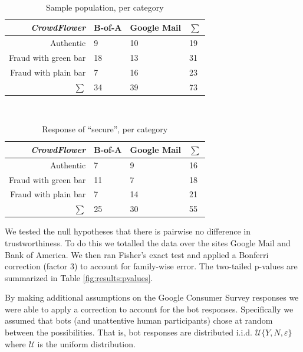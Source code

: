 \documentclass[twoside,letterpaper]{soups}
\begin{document}
\begin{table}
\centering
\caption{Sample population, per category}
\mbox{}\\
\begin{tabular}{|r|l|l|l|}
\hline
\emph{CrowdFlower}   & B-of-A   & Google Mail   & $\sum$ \\
\hline
Authentic            & 9        & 10            & 19 \\
\hline
Fraud with green bar & 18       & 13            & 31 \\
\hline
Fraud with plain bar & 7        & 16            & 23 \\
\hline
$\sum$               & 34       & 39            & 73 \\
\hline
\end{tabular}
\label{fig:results-cf:population}
\end{table}

\begin{table}
\centering
\caption{Response of ``secure'', per category}
\mbox{}\\
\begin{tabular}{|r|l|l|l|}
\hline
\emph{CrowdFlower}   & B-of-A   & Google Mail   & $\sum$ \\
\hline
Authentic            & 7        & 9             & 16 \\
\hline
Fraud with green bar & 11       & 7             & 18 \\
\hline
Fraud with plain bar & 7        & 14            & 21 \\
\hline
$\sum$               & 25       & 30            & 55 \\
\hline
\end{tabular}
\label{fig:results-cf:trusters}
\end{table}


We tested the null hypotheses that there is pairwise no difference in trustworthiness. To do this we totalled the data over the sites Google Mail and Bank of America. We then ran Fisher's exact test and applied a Bonferri correction (factor 3) to account for family-wise error. The two-tailed p-values are summarized in Table \ref{fig:results:pvalues}.

By making additional assumptions on the Google Consumer Survey responses we were able to apply a correction to account for the bot responses. Specifically we assumed that bots (and unattentive human participants) chose at random between the possibilities. That is, bot responses are distributed i.i.d. $\mathcal U\{Y,N,\varepsilon\}$ where $\mathcal U$ is the uniform distribution.
\end{document}
